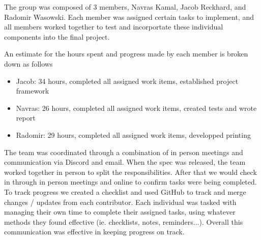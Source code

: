 The group was composed of 3 members, Navras Kamal, Jacob Reckhard, and
Radomir Wasowski.  Each member was assigned certain tasks to implement, and
all members worked together to test and incorportate these individual
components into the final project.

An estimate for the hours spent and progress made by each member is broken down as follows
\begin{itemize}
\item{Jacob: 34 hours, completed all assigned work items, established project framework}
\item{Navras: 26 hours, completed all assigned work items, created tests and wrote report}
\item{Radomir: 29 hours, completed all assigned work items, developped printing}
\end{itemize}

The team was coordinated through a combination of in person meetings and
communication via Discord and email.  When the spec was released, the team
worked together in person to split the responsibilities.  After that we would
check in through in person meetings and online to confirm tasks were being
completed.  To track progress we created a checklist and used GitHub to track
and merge changes / updates from each contributor.  Each individual was tasked
with managing their own time to complete their assigned tasks, using whatever
methods they found effective (ie. checklists, notes, reminders...).  Overall
this communication was effective in keeping progress on track.
